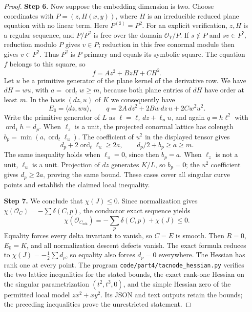 \begin{proof}
\noindent\textbf{Step 6.} Now suppose the embedding dimension is two. Choose coordinates
with $P=(z,H(x,y))$, where $H$ is an irreducible reduced plane
equation with no linear term. Here $P^{(2)}=P^2$.
For an explicit verification, $z,H$ is a regular sequence, and
$P/P^2$ is free over the domain $\mathcal O_Y/P$.
If $s\notin P$ and $sv\in P^2$, reduction modulo $P$ gives
$v\in P$; reduction in this free conormal module then gives
$v\in P^2$. Thus $P^2$ is $P$-primary and equals its symbolic
square. The equation $f$ belongs to this square, so
\[
 f=A z^2+B zH+C H^2.
\]
Let $u$ be a primitive generator of the plane kernel of the
derivative row. We have $dH=w u$, with
$a=\operatorname{ord}_t w\geq m$, because both plane entries
of $dH$ have order at least $m$. In the basis $(dz,u)$ of $K$
we consequently have
\[
 E_0=\langle dz,w u\rangle,
 \qquad q=2A\,dz^2+2Bw\,dz\,u+2Cw^2u^2.
\]
Write the primitive generator of $L$ as
$\ell=\ell_z dz+\ell_u u$, and again $q=h\ell^2$ with
$\operatorname{ord}_t h=d_p$.
When $\ell_z$ is a unit, the projected conormal lattice has
colength $b_p=\min(a,\operatorname{ord}_t\ell_u)$.
The coefficient of $u^2$ in the displayed tensor gives
\[
 d_p+2\operatorname{ord}_t\ell_u\geq2a,
 \qquad d_p/2+b_p\geq a\geq m.
\]
The same inequality holds when $\ell_u=0$, since then $b_p=a$.
When $\ell_z$ is not a unit, $\ell_u$ is a unit. Projection of
$dz$ generates $K/L$, so $b_p=0$; the $u^2$ coefficient gives
$d_p\geq2a$, proving the same bound. These cases cover all
singular curve points and establish the claimed local inequality.

\noindent\textbf{Step 7.} We conclude that $\chi(J)\leq0$. Since normalization gives
$\chi(\mathcal O_C)=-\sum\delta(C,p)$, the conductor exact
sequence yields
\[
 \chi(\mathcal O_{C_{\mathrm{sch}}})
 =-\sum_p\delta(C,p)+\chi(J)\leq0.
\]
Equality forces every delta invariant to vanish, so $C=E$ is
smooth. Then $R=0$, $E_0=K$, and all normalization descent
defects vanish. The exact formula reduces to
$\chi(J)=-\tfrac12\sum d_p$, so equality also forces
$d_p=0$ everywhere. The Hessian has rank one at every point.
The program \texttt{code/part4/tacnode\_hessian.py} verifies the
two lattice inequalities for the stated bounds, the exact
rank-one Hessian on the singular parametrization
$(t^2,t^3,0)$, and the simple Hessian zero of the permitted
local model $zx^2+xy^2$. Its JSON and text outputs retain
the bounds; the preceding inequalities prove the unrestricted
statement.
\end{proof}

